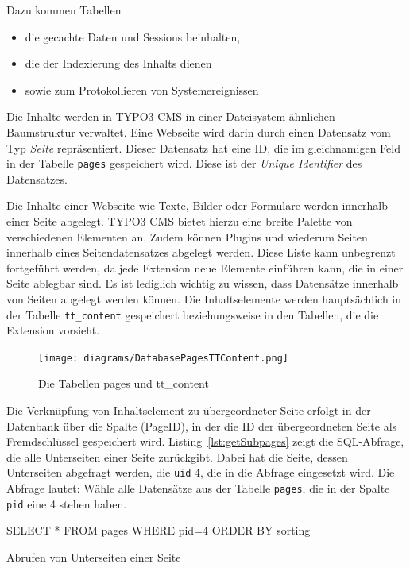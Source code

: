 Dazu kommen Tabellen
\begin{itemize}
	\item die gecachte Daten und Sessions beinhalten,
	\item die der Indexierung des Inhalts dienen
	\item sowie zum Protokollieren von Systemereignissen
\end{itemize}

Die Inhalte werden in TYPO3 CMS in einer Dateisystem ähnlichen Baumstruktur verwaltet. Eine Webseite wird darin durch einen Datensatz vom Typ \textit{Seite} repräsentiert. Dieser Datensatz hat eine ID, die im gleichnamigen Feld in der Tabelle \texttt{pages} gespeichert wird. Diese ist der \textit{Unique Identifier} des Datensatzes.

Die Inhalte einer Webseite wie Texte, Bilder oder Formulare werden innerhalb einer Seite abgelegt. TYPO3 CMS bietet hierzu eine breite Palette von verschiedenen Elementen an. Zudem können Plugins und wiederum Seiten innerhalb eines Seitendatensatzes abgelegt werden. Diese Liste kann unbegrenzt fortgeführt werden, da jede Extension neue Elemente einführen kann, die in einer Seite ablegbar sind. Es ist lediglich wichtig zu wissen, dass Datensätze innerhalb von Seiten abgelegt werden können. Die Inhaltselemente werden hauptsächlich in der Tabelle \texttt{tt\_content} gespeichert beziehungsweise in den Tabellen, die die Extension vorsieht.

\begin{figure}[H]
	\centering
	\texttt{[image: diagrams/DatabasePagesTTContent.png]}
	\caption{Die Tabellen pages und tt\_content}
	\label{fig:pagesAndTTContent}
\end{figure}

Die Verknüpfung von Inhaltselement zu übergeordneter Seite erfolgt in der Datenbank über die Spalte  (PageID), in der die ID der übergeordneten Seite als Fremdschlüssel gespeichert wird. Listing~\ref{lst:getSubpages} zeigt die SQL-Abfrage, die alle Unterseiten einer Seite zurückgibt. Dabei hat die Seite, dessen Unterseiten abgefragt werden, die \texttt{uid} 4, die in die Abfrage eingesetzt wird. Die Abfrage lautet: Wähle alle Datensätze aus der Tabelle \texttt{pages}, die in der Spalte \texttt{pid} eine 4 stehen haben.

\begin{listing}
	\begin{phpcode}
SELECT * FROM pages WHERE pid=4 ORDER BY sorting
	\end{phpcode}
	\caption{Abrufen von Unterseiten einer Seite}
	\label{lst:getSubpages}
\end{listing}

